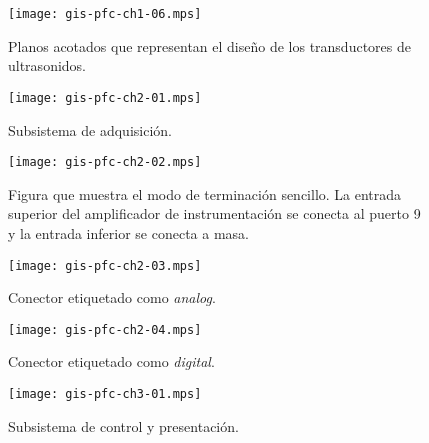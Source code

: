 \documentclass[a4paper,12pt]{article}
\begin{document}
\begin{figure}
	\begin{center}
		\texttt{[image: gis-pfc-ch1-06.mps]}
	\end{center}
	\caption[Transductores de ultrasonidos]{Planos acotados que representan el diseño de los
	transductores de ultrasonidos.}
	\label{fig:transducers}
\end{figure}

\begin{figure}
	\begin{center}
		\texttt{[image: gis-pfc-ch2-01.mps]}
	\end{center}
	\caption[Subsistema de adquisición]{Subsistema de adquisición.}
	\label{fig:subacqui}
\end{figure}

\begin{figure}
	\begin{center}
		\texttt{[image: gis-pfc-ch2-02.mps]}
	\end{center}
	\caption[Ejemplo de configuración de terminación]{Figura que muestra el modo de terminación sencillo. La entrada superior del amplificador de instrumentación se conecta al puerto 9 y la entrada inferior se conecta a masa.}
	\label{fig:termmodes}
\end{figure}

\clearpage

\begin{figure}
	\begin{center}
		\texttt{[image: gis-pfc-ch2-03.mps]}
	\end{center}
	\caption[Conector etiquetado como \emph{analog}]{Conector etiquetado como \emph{analog}.}
	\label{fig:analog}
\end{figure}

\begin{figure}
	\begin{center}
		\texttt{[image: gis-pfc-ch2-04.mps]}
	\end{center}
	\caption[Conector etiquetado como \emph{digital}]{Conector etiquetado como \emph{digital}.}
	\label{fig:digital}
\end{figure}

\begin{figure}
	\begin{center}
		\texttt{[image: gis-pfc-ch3-01.mps]}
	\end{center}
	\caption[Subsistema de control y presentación]{Subsistema de control y presentación.}
	\label{sub:control}
\end{figure}
\end{document}
